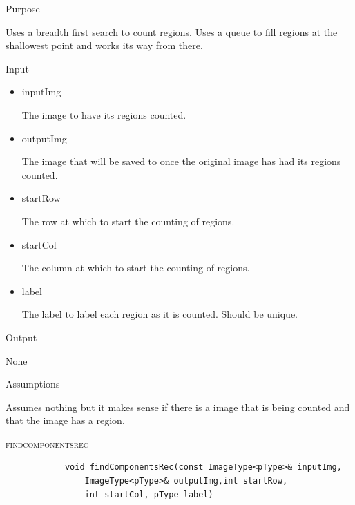 \documentclass[pdftex, 11pt]{article}
\begin{document}
\begin{description}
		\begin{description}
			\item{Purpose}

				Uses a breadth first search to count regions. Uses
				a queue to fill regions at the shallowest point
				and works its way from there.

			\item{Input}

				\begin{itemize}

					\item{inputImg}

						The image to have its regions
						counted.

					\item{outputImg}

						The image that will be saved to
						once the original image has had
						its regions counted.

					\item{startRow}

						The row at which to start the
						counting of regions.

					\item{startCol}

						The column at which to start the
						counting of regions.

					\item{label}

						The label to label each region
						as it is counted. Should be
						unique.
				

				\end{itemize}

			\item{Output}

				None

			\item{Assumptions}

				Assumes nothing but it makes sense if there is a
				image that is being counted and that the image
				has a region.


		\end{description}
		
	\item{\textsc{findcomponentsrec}}

		\begin{lstlisting}
			void findComponentsRec(const ImageType<pType>& inputImg,
				ImageType<pType>& outputImg,int startRow, 
				int startCol, pType label)
		\end{lstlisting}


\end{description}
\end{document}
